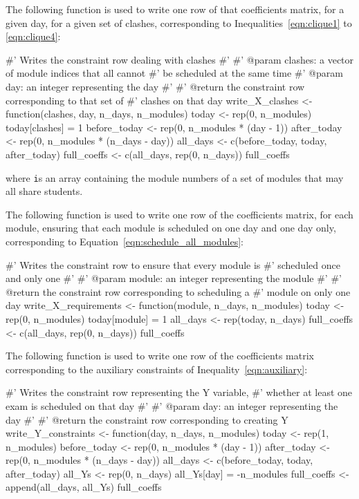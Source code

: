 The following function is used to write one row of that coefficients matrix, for
a given day, for a given set of clashes, corresponding to
Inequalities~\ref{eqn:clique1} to \ref{eqn:clique4}:

\begin{Rin}
#' Writes the constraint row dealing with clashes
#'
#' @param clashes: a vector of module indices that all cannot
#'                 be scheduled at the same time
#' @param day: an integer representing the day
#'
#' @return the constraint row corresponding to that set of
#'         clashes on that day
write_X_clashes <- function(clashes, day, n_days, n_modules){
  today <- rep(0, n_modules)
  today[clashes] = 1
  before_today <- rep(0, n_modules * (day - 1))
  after_today <- rep(0, n_modules * (n_days - day))
  all_days <- c(before_today, today, after_today)
  full_coeffs <- c(all_days, rep(0, n_days))
  full_coeffs
}
\end{Rin}

where \texttt is an array containing the module numbers of a set of
modules that may all share students.

The following function is used to write one row of the coefficients matrix, for
each module, ensuring that each module is scheduled on one day and one day only,
corresponding to Equation~\ref{eqn:schedule_all_modules}:

\begin{Rin}
#' Writes the constraint row to ensure that every module is
#' scheduled once and only one
#'
#' @param module: an integer representing the module
#'
#' @return the constraint row corresponding to scheduling a
#'         module on only one day
write_X_requirements <- function(module, n_days, n_modules){
  today <- rep(0, n_modules)
  today[module] = 1
  all_days <- rep(today, n_days)
  full_coeffs <- c(all_days, rep(0, n_days))
  full_coeffs
}
\end{Rin}

The following function is used to write one row of the coefficients matrix
corresponding to the auxiliary constraints of Inequality~\ref{eqn:auxiliary}:

\begin{Rin}
#' Writes the constraint row representing the Y variable,
#' whether at least one exam is scheduled on that day
#'
#' @param day: an integer representing the day
#'
#' @return the constraint row corresponding to creating Y
write_Y_constraints <- function(day, n_days, n_modules){
  today <- rep(1, n_modules)
  before_today <- rep(0, n_modules * (day - 1))
  after_today <- rep(0, n_modules * (n_days - day))
  all_days <- c(before_today, today, after_today)
  all_Ys <- rep(0, n_days)
  all_Ys[day] = -n_modules
  full_coeffs <- append(all_days, all_Ys)
  full_coeffs
}
\end{Rin}

